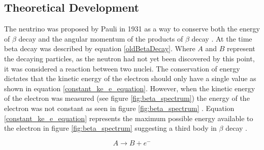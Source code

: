 \subsection{Theoretical Development}
The neutrino was proposed by Pauli in 1931 as a way to conserve both the energy of $\beta$ decay and the angular momentum of the products of $\beta$ decay  \cite{griffiths2008book}\cite{griffiths2008neutrino1.5}\cite{lederman1970resource}. At the time beta decay was described by equation \ref{oldBetaDecay}. Where $A$ and $B$ represent the decaying particles, as the neutron had not yet been discovered by this point, it was considered a reaction between two nuclei. The conservation of energy dictates that the kinetic energy of the electron should only have a single value as shown in equation \ref{constant_ke_e_equation}. However, when the kinetic energy of the electron was measured (see figure \ref{fig:beta_spectrum}) the energy of the electron was not constant as seen in figure \ref{fig:beta_spectrum} \cite{griffiths2008book} \cite{griffiths2008neutrino1.5} \cite{lewis1970neutrinos}. Equation \ref{constant_ke_e_equation} represents the maximum possible energy available to the electron in figure \ref{fig:beta_spectrum} suggesting a third body in $\beta$ decay \cite{griffiths2008book} \cite{griffiths2008neutrino1.5}.


\begin{equation}
    A \rightarrow B + e^-
    \label{oldBetaDecay}
\end{equation}

